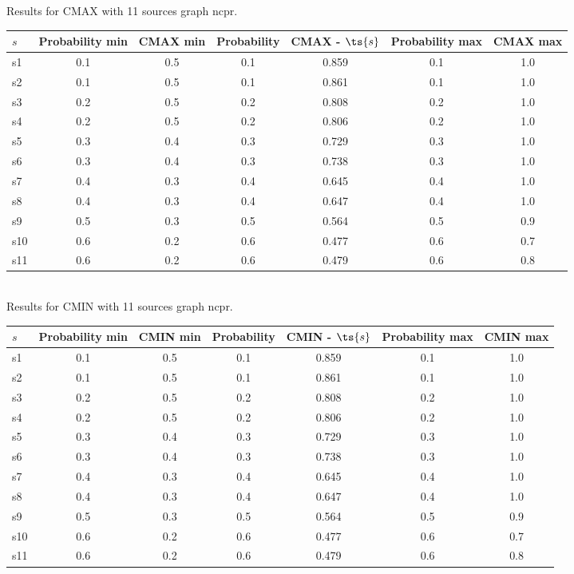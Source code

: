 \documentclass{article}
\begin{document}
\noindent Results for CMAX with 11 sources graph ncpr.

\noindent\begin{tabular}{|l|c|c|c|c|c|c|}
\hline
$s$& Probability min & CMAX min & Probability & CMAX - $\ts{s}$ & Probability max & CMAX max\\
\hline
s1 &0.1 & 0.5 & 0.1 & 0.859 & 0.1 & 1.0\\
\hline
s2 &0.1 & 0.5 & 0.1 & 0.861 & 0.1 & 1.0\\
\hline
s3 &0.2 & 0.5 & 0.2 & 0.808 & 0.2 & 1.0\\
\hline
s4 &0.2 & 0.5 & 0.2 & 0.806 & 0.2 & 1.0\\
\hline
s5 &0.3 & 0.4 & 0.3 & 0.729 & 0.3 & 1.0\\
\hline
s6 &0.3 & 0.4 & 0.3 & 0.738 & 0.3 & 1.0\\
\hline
s7 &0.4 & 0.3 & 0.4 & 0.645 & 0.4 & 1.0\\
\hline
s8 &0.4 & 0.3 & 0.4 & 0.647 & 0.4 & 1.0\\
\hline
s9 &0.5 & 0.3 & 0.5 & 0.564 & 0.5 & 0.9\\
\hline
s10 &0.6 & 0.2 & 0.6 & 0.477 & 0.6 & 0.7\\
\hline
s11 &0.6 & 0.2 & 0.6 & 0.479 & 0.6 & 0.8\\
\hline
\end{tabular}\\

\noindent Results for CMIN with 11 sources graph ncpr.

\noindent\begin{tabular}{|l|c|c|c|c|c|c|}
\hline
$s$& Probability min & CMIN min & Probability & CMIN - $\ts{s}$ & Probability max & CMIN max\\
\hline
s1 &0.1 & 0.5 & 0.1 & 0.859 & 0.1 & 1.0\\
\hline
s2 &0.1 & 0.5 & 0.1 & 0.861 & 0.1 & 1.0\\
\hline
s3 &0.2 & 0.5 & 0.2 & 0.808 & 0.2 & 1.0\\
\hline
s4 &0.2 & 0.5 & 0.2 & 0.806 & 0.2 & 1.0\\
\hline
s5 &0.3 & 0.4 & 0.3 & 0.729 & 0.3 & 1.0\\
\hline
s6 &0.3 & 0.4 & 0.3 & 0.738 & 0.3 & 1.0\\
\hline
s7 &0.4 & 0.3 & 0.4 & 0.645 & 0.4 & 1.0\\
\hline
s8 &0.4 & 0.3 & 0.4 & 0.647 & 0.4 & 1.0\\
\hline
s9 &0.5 & 0.3 & 0.5 & 0.564 & 0.5 & 0.9\\
\hline
s10 &0.6 & 0.2 & 0.6 & 0.477 & 0.6 & 0.7\\
\hline
s11 &0.6 & 0.2 & 0.6 & 0.479 & 0.6 & 0.8\\
\hline
\end{tabular}\\
\end{document}
